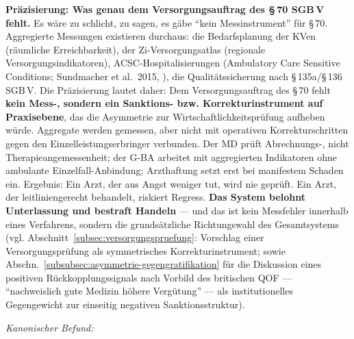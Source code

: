 \documentclass{umbruch-position}
\begin{document}
\medskip
\noindent\textbf{Pr\"azisierung: Was genau dem Versorgungsauftrag des \S\,70 SGB\,V fehlt.} Es w\"are zu schlicht, zu sagen, es g\"abe ``kein Messinstrument'' f\"ur \S\,70. Aggregierte Messungen existieren durchaus: die Bedarfsplanung der KVen (r\"aumliche Erreichbarkeit), der Zi-Versorgungsatlas \cite{zi_versorgungsatlas} (regionale Versorgungs\-indikatoren), ACSC-Hospitalisierungen (Ambulatory Care Sensitive Conditions; Sundmacher et al.\ 2015, \cite{glaeske_pfaff_lehrbuch}), die Qualit\"atssicherung nach \S\,135a/\S\,136 SGB\,V. Die Pr\"azisierung lautet daher: Dem Versorgungsauftrag des \S\,70 fehlt \textbf{kein Mess-, sondern ein Sanktions- bzw. Korrekturinstrument auf Praxisebene}, das die Asymmetrie zur Wirtschaftlichkeitspr\"ufung aufheben w\"urde. Aggregate werden gemessen, aber nicht mit operativen Korrekturschritten gegen den Einzel\-leistungs\-erbringer verbunden. Der MD pr\"uft Abrechnungs-, nicht Therapieangemessenheit; der G-BA arbeitet mit aggregierten Indikatoren ohne ambulante Einzelfall-Anbindung; Arzthaftung setzt erst bei manifestem Schaden ein. Ergebnis: Ein Arzt, der aus Angst weniger tut, wird nie gepr\"uft. Ein Arzt, der leitliniengerecht behandelt, riskiert Regress. \textbf{Das System belohnt Unterlassung und bestraft Handeln} --- und das ist kein Messfehler innerhalb eines Verfahrens, sondern die grunds\"atzliche Richtungswahl des Gesamtsystems (vgl. Abschnitt~\ref{subsec:versorgungspruefung}: Vorschlag einer Versorgungspr\"ufung als symmetrisches Korrekturinstrument; sowie Abschn.~\ref{subsubsec:asymmetrie-gegengratifikation} f\"ur die Diskussion eines positiven R\"uckkopplungssignals nach Vorbild des britischen QOF --- ``nachweislich gute Medizin h\"ohere Verg\"utung'' --- als institutionelles Gegengewicht zur einseitig negativen Sanktionsstruktur).

\medskip
\noindent\textit{Kanonischer Befund:}
\end{document}
